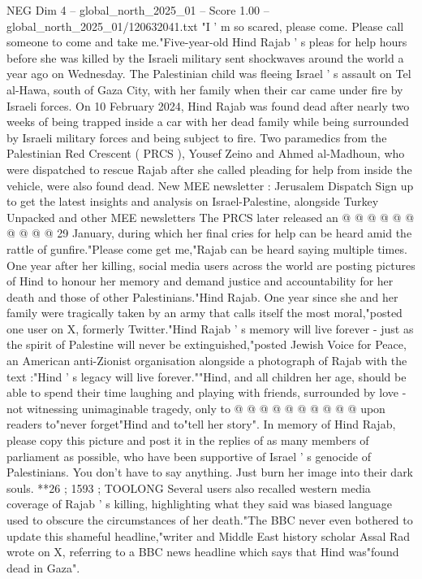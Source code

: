 \begin{textsample}{NEG Dim 4 – global\_north\_2025\_01 – Score 1.00 – global\_north\_2025\_01/120632041.txt}  \label{ex:f4_neg_416}
"I ' m so scared, please come.
Please call someone to come and take me."Five-year-old Hind Rajab ' s pleas for help hours before she was killed by the Israeli military sent shockwaves around the world a year ago on Wednesday.
The Palestinian child was fleeing Israel ' s assault on Tel al-Hawa, south of Gaza City, with her family when their car came under fire by Israeli forces.
On 10 February 2024, Hind Rajab was found dead after nearly two weeks of being trapped inside a car with her dead family while being surrounded by Israeli military forces and being subject to fire.
Two paramedics from the Palestinian Red Crescent ( PRCS ), Yousef Zeino and Ahmed al-Madhoun, who were dispatched to rescue Rajab after she called pleading for help from inside the vehicle, were also found dead.
New MEE newsletter : Jerusalem Dispatch Sign up to get the latest insights and analysis on Israel-Palestine, alongside Turkey Unpacked and other MEE newsletters The PRCS later released an @ @ @ @ @ @ @ @ @ @ 29 January, during which her final cries for help can be heard amid the rattle of gunfire."Please come get me,"Rajab can be heard saying multiple times.
One year after her killing, social media users across the world are posting pictures of Hind to honour her memory and demand justice and accountability for her death and those of other Palestinians."Hind Rajab.
One year since she and her family were tragically taken by an army that calls itself the most moral,"posted one user on X, formerly Twitter."Hind Rajab ' s memory will live forever - just as the spirit of Palestine will never be extinguished,"posted Jewish Voice for Peace, an American anti-Zionist organisation alongside a photograph of Rajab with the text :"Hind ' s legacy will live forever.""Hind, and all children her age, should be able to spend their time laughing and playing with friends, surrounded by love - not witnessing unimaginable tragedy, only to @ @ @ @ @ @ @ @ @ @ upon readers to"never forget"Hind and to"tell her story".
In memory of Hind Rajab, please copy this picture and post it in the replies of as many members of parliament as possible, who have been supportive of Israel ' s genocide of Palestinians.
You don't have to say anything.
Just burn her image into their dark souls. **26 ; 1593 ; TOOLONG Several users also recalled western media coverage of Rajab ' s killing, highlighting what they said was biased language used to obscure the circumstances of her death."The BBC never even bothered to update this shameful headline,"writer and Middle East history scholar Assal Rad wrote on X, referring to a BBC news headline which says that Hind was"found dead in Gaza".

\end{textsample}
